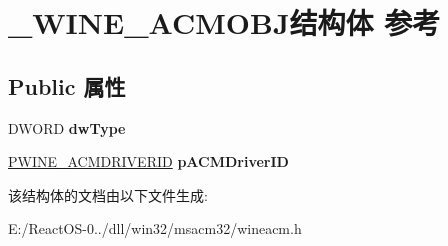 \hypertarget{struct___w_i_n_e___a_c_m_o_b_j}{}\section{\+\_\+\+W\+I\+N\+E\+\_\+\+A\+C\+M\+O\+B\+J结构体 参考}
\label{struct___w_i_n_e___a_c_m_o_b_j}
\subsection*{Public 属性}
\begin{DoxyCompactItemize}
\item 
\mbox{\label{struct___w_i_n_e___a_c_m_o_b_j_ad90bbe57dff7c65d958d108ec8e6f3ba}} 
D\+W\+O\+RD {\bfseries dw\+Type}
\item 
\mbox{\label{struct___w_i_n_e___a_c_m_o_b_j_a99632d48d4ea8aa82188c13993868748}} 
\hyperlink{struct___w_i_n_e___a_c_m_d_r_i_v_e_r_i_d}{P\+W\+I\+N\+E\+\_\+\+A\+C\+M\+D\+R\+I\+V\+E\+R\+ID} {\bfseries p\+A\+C\+M\+Driver\+ID}
\end{DoxyCompactItemize}


该结构体的文档由以下文件生成\+:\begin{DoxyCompactItemize}
\item 
E\+:/\+React\+O\+S-\/0../dll/win32/msacm32/wineacm.\+h\end{DoxyCompactItemize}
